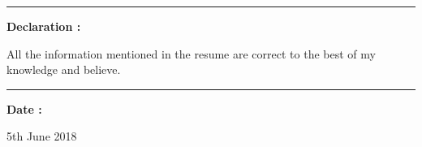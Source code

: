 \documentclass[11pt,a4paper]{article}
\begin{document}
\hrule
\begin{multicols}{2}
	\begin{minipage}{0.17\paperwidth}
		\textbf{Declaration :}
	\end{minipage}
	\begin{minipage}{0.7\paperwidth}
		All the information mentioned in the resume are correct to the best of my knowledge and believe.
	\end{minipage}
\end{multicols}
\hfill
\hrule
\begin{multicols}{2}
	\begin{minipage}{0.17\paperwidth}
		\textbf{Date :}
	\end{minipage}
	\begin{minipage}{0.7\paperwidth}
		5th June 2018
	\end{minipage}
\end{multicols}
\end{document}

